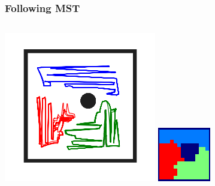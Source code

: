\documentclass{beamer}
\begin{document}
    \begin{frame}
        \frametitle{Following MST}
        \begin{columns}
        \includegraphics[width=\columnwidth]{dec2.png}
        \includegraphics[width=\columnwidth]{owned_regions_2.png}
        \end{columns}
        
    \end{frame}
    
\end{document}
